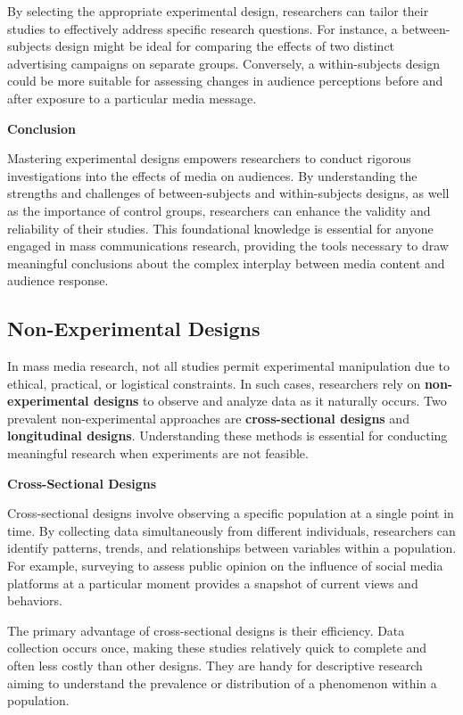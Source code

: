 \documentclass[
]{book}
\begin{document}
By selecting the appropriate experimental design, researchers can tailor their studies to effectively address specific research questions. For instance, a between-subjects design might be ideal for comparing the effects of two distinct advertising campaigns on separate groups. Conversely, a within-subjects design could be more suitable for assessing changes in audience perceptions before and after exposure to a particular media message.

\textbf{Conclusion}

Mastering experimental designs empowers researchers to conduct rigorous investigations into the effects of media on audiences. By understanding the strengths and challenges of between-subjects and within-subjects designs, as well as the importance of control groups, researchers can enhance the validity and reliability of their studies. This foundational knowledge is essential for anyone engaged in mass communications research, providing the tools necessary to draw meaningful conclusions about the complex interplay between media content and audience response.

\subsection*{Non-Experimental Designs}\label{non-experimental-designs}

In mass media research, not all studies permit experimental manipulation due to ethical, practical, or logistical constraints. In such cases, researchers rely on \textbf{non-experimental designs} to observe and analyze data as it naturally occurs. Two prevalent non-experimental approaches are \textbf{cross-sectional designs} and \textbf{longitudinal designs}. Understanding these methods is essential for conducting meaningful research when experiments are not feasible.

\textbf{Cross-Sectional Designs}

Cross-sectional designs involve observing a specific population at a single point in time. By collecting data simultaneously from different individuals, researchers can identify patterns, trends, and relationships between variables within a population. For example, surveying to assess public opinion on the influence of social media platforms at a particular moment provides a snapshot of current views and behaviors.

The primary advantage of cross-sectional designs is their efficiency. Data collection occurs once, making these studies relatively quick to complete and often less costly than other designs. They are handy for descriptive research aiming to understand the prevalence or distribution of a phenomenon within a population.
\end{document}
